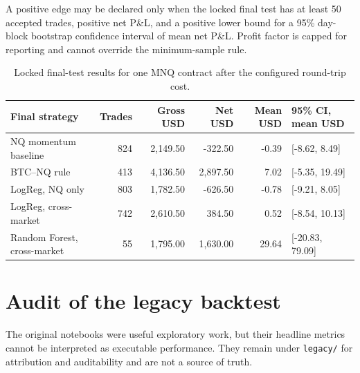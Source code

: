 \documentclass[10pt]{article}
\begin{document}
A positive edge may be declared only when the locked final test has at least 50 accepted trades, positive net P\&L, and a positive lower bound for a 95\% day-block bootstrap confidence interval of mean net P\&L. Profit factor is capped for reporting and cannot override the minimum-sample rule.

\begin{table}[ht]
\centering
\small
\begin{tabular}{lrrrrl}
\toprule
Final strategy & Trades & Gross USD & Net USD & Mean USD & 95\% CI, mean USD \\
\midrule
NQ momentum baseline & 824 & 2,149.50 & -322.50 & -0.39 & [-8.62, 8.49] \\
BTC--NQ rule & 413 & 4,136.50 & 2,897.50 & 7.02 & [-5.35, 19.49] \\
LogReg, NQ only & 803 & 1,782.50 & -626.50 & -0.78 & [-9.21, 8.05] \\
LogReg, cross-market & 742 & 2,610.50 & 384.50 & 0.52 & [-8.54, 10.13] \\
Random Forest, cross-market & 55 & 1,795.00 & 1,630.00 & 29.64 & [-20.83, 79.09] \\
\bottomrule
\end{tabular}
\caption{Locked final-test results for one MNQ contract after the configured round-trip cost.}
\end{table}

\newpage
\thispagestyle{fancy}
\section{Audit of the legacy backtest}
The original notebooks were useful exploratory work, but their headline metrics cannot be interpreted as executable performance. They remain under \texttt{legacy/} for attribution and auditability and are not a source of truth.
\end{document}
